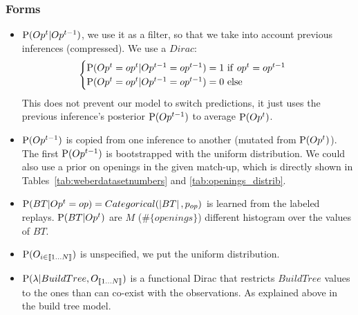 \subsubsection{Forms}
\begin{itemize}
\item $\mathrm{P}(Op^t | Op^{t-1})$, we use it as a filter, so that we take into account previous inferences (compressed). 
We use a $Dirac$:
\begin{eqnarray*}
\begin{cases}
\mathrm{P}(Op^t=op^t|Op^{t-1}=op^{t-1}) = 1\ \mathrm{if}\ op^t = op^{t-1}\\
\mathrm{P}(Op^t=op^t|Op^{t-1}=op^{t-1}) = 0\ \mathrm{else}
\end{cases}
\end{eqnarray*}
This does not prevent our model to switch predictions, it just uses the previous inference's posterior $\mathrm{P}(Op^{t-1})$ to average $\mathrm{P}(Op^t)$.

\item $\mathrm{P}(Op^{t-1})$ is copied from one inference to another (mutated from $\mathrm{P}(Op^t)$). The first $\mathrm{P}(Op^{t-1})$ is bootstrapped with the uniform distribution. We could also use a prior on openings in the given match-up, which is directly shown in Tables~\ref{tab:weberdatasetnumbers} and \ref{tab:openings_distrib}.

\item $\mathrm{P}(BT | Op^t=op)=Categorical(\left\lvert BT\right\rvert,p_{op})$ is learned from the labeled replays. $\mathrm{P}(BT|Op^t)$ are $M$ ($\#\{openings\}$) different histogram over the values of $BT$.
\item $\mathrm{P}(O_{i \in \llbracket 1 \dots N\rrbracket})$ is unspecified, we put the uniform distribution.
\item $\mathrm{P}(\lambda | BuildTree, O_{\llbracket 1 \dots N\rrbracket})$ is a functional Dirac that restricts $BuildTree$ values to the ones than can co-exist with the observations. As explained above in the build tree model.


\end{itemize}
